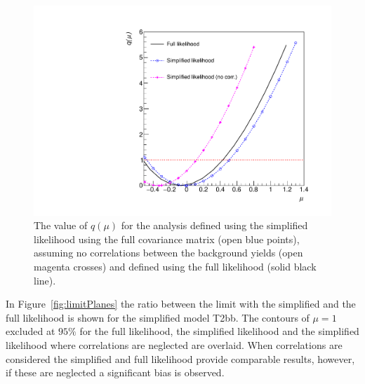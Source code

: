 \begin{figure}[hbt]
  \begin{center} 
   \includegraphics[width=1.5\cmsFigWidth]{figures/alphaT/rAT.pdf}
   \caption{The value of $q(\mu)$ for the \alphaT analysis defined using the simplified likelihood using the full covariance matrix (open blue points), assuming no correlations between the 
   background yields (open magenta crosses) and defined using the full likelihood (solid black line).}
   \label{fig:likelihoodscanAT} 
  \end{center}
\end{figure}

In Figure~\ref{fig:limitPlanes} the ratio between the limit with the simplified and the full likelihood is shown
for the simplified model T2bb. The contours of $\mu=1$ excluded at $95\%$ for the full likelihood, 
the simplified likelihood and the simplified likelihood where correlations are neglected are overlaid. When correlations
are considered the simplified and full likelihood provide comparable results, however, if 
these are neglected a significant bias is observed.

